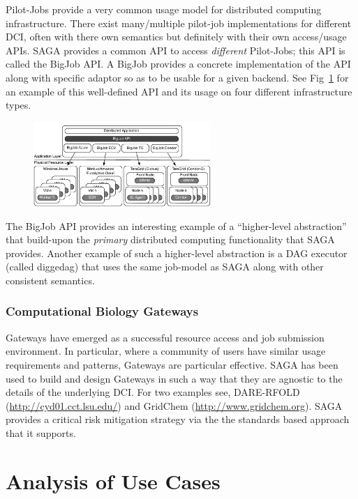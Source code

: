 \documentclass[12pt]{article}
\begin{document}
Pilot-Jobs provide a very common usage model for distributed computing
infrastructure. There exist many/multiple pilot-job implementations
for different DCI, often with there own semantics but definitely with
their own access/usage APIs. SAGA provides a common API to access {\it
  different} Pilot-Jobs; this API is called the BigJob API. A BigJob
provides a concrete implementation of the API along with specific
adaptor so as to be usable for a given backend. See
Fig~\ref{fig:sagabigjob} for an example of this well-defined API and
its usage on four different infrastructure types.
\begin{figure}[t]
      \centering
      \includegraphics[width=0.6\textwidth]{distributed_pilot_job.png}
      \caption{\footnotesize }
      \label{fig:sagabigjob}
\end{figure}

The BigJob API provides an interesting example of a ``higher-level
abstraction'' that build-upon the {\it primary} distributed computing
functionality that SAGA provides. Another example of such a
higher-level abstraction is a DAG executor (called diggedag) that uses
the same job-model as SAGA along with other consistent semantics.

\subsubsection*{Computational Biology Gateways}

Gateways have emerged as a successful resource access and job
submission environment.  In particular, where a community of users
have similar usage requirements and patterns, Gateways are particular
effective.  SAGA has been used to build and design Gateways in such a
way that they are agnostic to the details of the underlying DCI. For
two examples see, DARE-RFOLD (\url{http://cyd01.cct.lsu.edu/}) and
GridChem (\url{http://www.gridchem.org}).  SAGA provides a critical
risk mitigation strategy via the the standards based approach that it
supports.

\section{Analysis of Use Cases}
\end{document}
